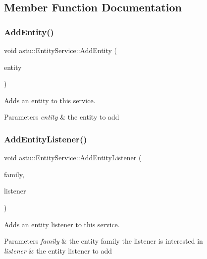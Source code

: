 \subsection{Member Function Documentation}
\mbox{\label{classastu_1_1EntityService_ad6c6cb81dc8c48c7688f438571ee5da8}} 
\subsubsection{\texorpdfstring{Add\+Entity()}{AddEntity()}}
{\footnotesize\ttfamily void astu\+::\+Entity\+Service\+::\+Add\+Entity (\begin{DoxyParamCaption}\item[{std\+::shared\+\_\+ptr$<$ \hyperlink{classastu_1_1Entity}{Entity} $>$}]{entity }\end{DoxyParamCaption})}

Adds an entity to this service.


\begin{DoxyParams}{Parameters}
{\em entity} & the entity to add \\
\hline
\end{DoxyParams}
\mbox{\label{classastu_1_1EntityService_ab338b1904b61dfe71c2b3bbcb390ada1}} 
\subsubsection{\texorpdfstring{Add\+Entity\+Listener()}{AddEntityListener()}}
{\footnotesize\ttfamily void astu\+::\+Entity\+Service\+::\+Add\+Entity\+Listener (\begin{DoxyParamCaption}\item[{const \hyperlink{classastu_1_1EntityFamily}{Entity\+Family} \&}]{family,  }\item[{\hyperlink{classastu_1_1IEntityListener}{I\+Entity\+Listener} \&}]{listener }\end{DoxyParamCaption})}

Adds an entity listener to this service.


\begin{DoxyParams}{Parameters}
{\em family} & the entity family the listener is interested in \\
\hline
{\em listener} & the entity listener to add \\
\hline
\end{DoxyParams}
\mbox{\label{classastu_1_1EntityService_aa295c07eb6a5c5321cf5820c9e41d008}} 
